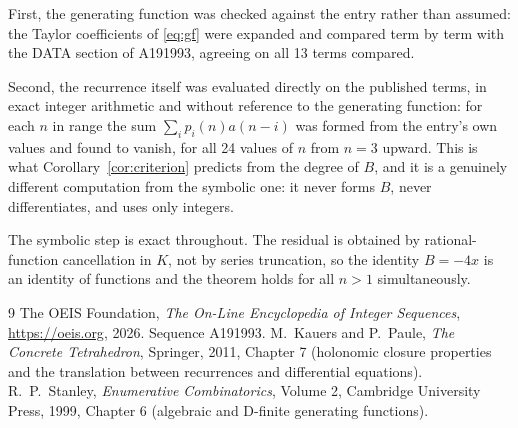 \documentclass[11pt,a4paper]{article}
\theoremstyle{plain}
\theoremstyle{definition}
\begin{document}
First, the generating function was checked against the entry rather than assumed: the
Taylor coefficients of \eqref{eq:gf} were expanded and compared term by term with the DATA
section of A191993, agreeing on all 13 terms compared.

Second, the recurrence itself was evaluated directly on the published terms, in exact
integer arithmetic and without reference to the generating function: for each $n$ in range
the sum $\sum_{i}p_{i}(n)a(n-i)$ was formed from the entry's own values and found to
vanish, for all 24 values of $n$ from $n=3$ upward. This is what
Corollary~\ref{cor:criterion} predicts from the degree of $B$, and it is a genuinely
different computation from the symbolic one: it never forms $B$, never differentiates, and
uses only integers.

The symbolic step is exact throughout. The residual is obtained by rational-function
cancellation in $K$, not by series truncation, so the identity $B=- 4 x$ is an
identity of functions and the theorem holds for all $n>1$ simultaneously.

\begin{thebibliography}{9}
 The OEIS Foundation, \emph{The On-Line Encyclopedia of Integer Sequences},
\url{https://oeis.org}, 2026. Sequence A191993.
 M.~Kauers and P.~Paule, \emph{The Concrete Tetrahedron}, Springer, 2011,
Chapter 7 (holonomic closure properties and the translation between recurrences and
differential equations).
 R.~P.~Stanley, \emph{Enumerative Combinatorics}, Volume 2, Cambridge
University Press, 1999, Chapter 6 (algebraic and D-finite generating functions).
\end{thebibliography}
\end{document}
